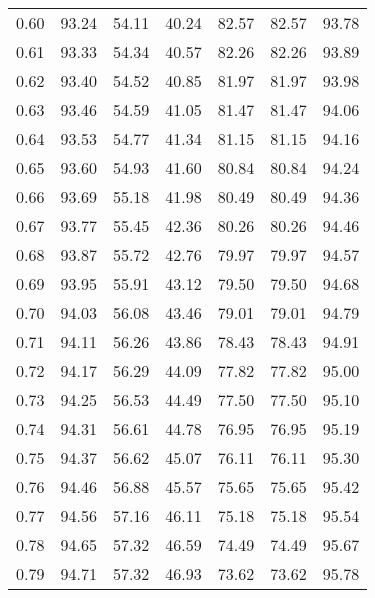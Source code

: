 \begin{tabular}{|c|c|c|c|c|c|c|}
      0.60 &     93.24 &     54.11 &      40.24 &   82.57 &      82.57 &         93.78 \\
      0.61 &     93.33 &     54.34 &      40.57 &   82.26 &      82.26 &         93.89 \\
      0.62 &     93.40 &     54.52 &      40.85 &   81.97 &      81.97 &         93.98 \\
      0.63 &     93.46 &     54.59 &      41.05 &   81.47 &      81.47 &         94.06 \\
      0.64 &     93.53 &     54.77 &      41.34 &   81.15 &      81.15 &         94.16 \\
      0.65 &     93.60 &     54.93 &      41.60 &   80.84 &      80.84 &         94.24 \\
      0.66 &     93.69 &     55.18 &      41.98 &   80.49 &      80.49 &         94.36 \\
      0.67 &     93.77 &     55.45 &      42.36 &   80.26 &      80.26 &         94.46 \\
      0.68 &     93.87 &     55.72 &      42.76 &   79.97 &      79.97 &         94.57 \\
      0.69 &     93.95 &     55.91 &      43.12 &   79.50 &      79.50 &         94.68 \\
      0.70 &     94.03 &     56.08 &      43.46 &   79.01 &      79.01 &         94.79 \\
      0.71 &     94.11 &     56.26 &      43.86 &   78.43 &      78.43 &         94.91 \\
      0.72 &     94.17 &     56.29 &      44.09 &   77.82 &      77.82 &         95.00 \\
      0.73 &     94.25 &     56.53 &      44.49 &   77.50 &      77.50 &         95.10 \\
      0.74 &     94.31 &     56.61 &      44.78 &   76.95 &      76.95 &         95.19 \\
      0.75 &     94.37 &     56.62 &      45.07 &   76.11 &      76.11 &         95.30 \\
      0.76 &     94.46 &     56.88 &      45.57 &   75.65 &      75.65 &         95.42 \\
      0.77 &     94.56 &     57.16 &      46.11 &   75.18 &      75.18 &         95.54 \\
      0.78 &     94.65 &     57.32 &      46.59 &   74.49 &      74.49 &         95.67 \\
      0.79 &     94.71 &     57.32 &      46.93 &   73.62 &      73.62 &         95.78 \\

\end{tabular}
